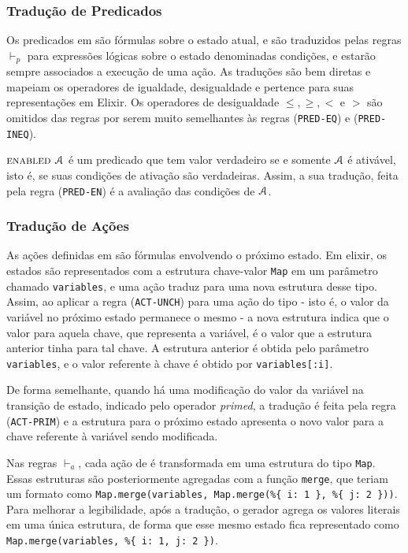 \subsubsection{Tradução de Predicados}

Os predicados em \TLA são fórmulas sobre o estado atual, e são traduzidos pelas
regras $\vdash_p$ para expressões lógicas sobre o estado denominadas condições, e estarão sempre
associados a execução de uma ação. As traduções são bem diretas e mapeiam os
operadores de igualdade, desigualdade e pertence para suas representações em
Elixir. Os operadores de desigualdade $\leq, \geq, <$ e $>$ são omitidos das
regras por serem muito semelhantes às regras (\texttt{PRED-EQ}) e
(\texttt{PRED-INEQ}).

$\textsc{enabled } \textbf{$\mathcal{A}$}$ é um predicado que tem valor verdadeiro se e somente
$\textbf{$\mathcal{A}$}$ é ativável, isto é, se suas condições de ativação são verdadeiras.
Assim, a sua tradução, feita pela regra (\texttt{PRED-EN}) é a avaliação das condições de $\textbf{$\mathcal{A}$}$.



\subsubsection{Tradução de Ações}

As ações definidas em \TLA são fórmulas envolvendo o próximo estado. Em elixir,
os estados são representados com a estrutura chave-valor \texttt{Map} em um parâmetro chamado \texttt{variables}, e uma
ação traduz para uma nova estrutura desse tipo. Assim, ao aplicar a regra (\texttt{ACT-UNCH}) para uma ação do
tipo \UNCHANGED - isto é, o valor da variável no próximo estado permanece o
mesmo - a nova estrutura indica que o valor para aquela chave, que representa a
variável, é o valor que a estrutura anterior tinha para tal chave. A
estrutura anterior é obtida pelo parâmetro \texttt{variables}, e o valor referente à
chave \tti é obtido por \texttt{variables[:i]}.

De forma semelhante, quando há uma modificação do valor da variável na transição
de estado, indicado pelo operador \textit{primed}, a tradução é feita pela regra
(\texttt{ACT-PRIM}) e a estrutura para o próximo estado apresenta o
novo valor para a chave referente à variável sendo modificada.

Nas regras $\vdash_a$, cada ação de \TLA é transformada em uma estrutura do tipo
\texttt{Map}. Essas estruturas são posteriormente agregadas com a função
\texttt{merge}, que teriam um formato como \texttt{Map.merge(variables, Map.merge(\%\{ i: 1 \}, \%\{
  j: 2 \}))}. Para melhorar a legibilidade, após a tradução, o gerador agrega os
valores literais em uma única estrutura, de forma que esse mesmo estado fica
representado como \texttt{Map.merge(variables, \%\{ i: 1, j: 2 \})}.

